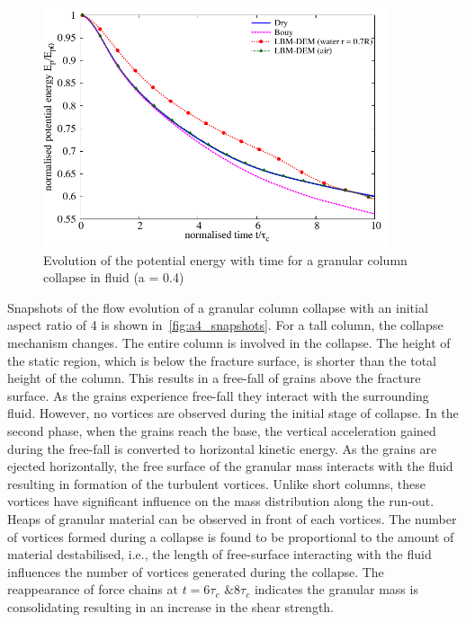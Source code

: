 \begin{figure}
	\centering
    \includegraphics[width=0.9\textwidth]{PE_a04f}
    \caption{Evolution of the potential energy with time for a granular column 
    collapse in fluid (a = 0.4)}
    \label{fig:PE_a04f}
\end{figure}


Snapshots of the flow evolution of a granular column collapse with an initial 
aspect ratio of 4 is shown in~\cref{fig:a4_snapshots}. For a tall column, the 
collapse mechanism changes. The entire column is involved in the collapse. The 
height of the static region, which is below the fracture surface, is shorter 
than the total height of the column. This results in a free-fall of grains 
above the fracture surface. As the grains experience free-fall they interact 
with the surrounding fluid. However, no vortices are observed during the 
initial stage of collapse. In the second phase, when the grains reach the base, 
the vertical acceleration gained during the free-fall is converted to 
horizontal kinetic energy. As the grains are ejected horizontally, the free 
surface of the granular mass interacts with the fluid resulting in formation of 
the turbulent vortices. Unlike short columns, these vortices have significant 
influence on the mass distribution along the run-out. Heaps of granular 
material can be observed in front of each vortices. The number of vortices 
formed during a collapse is found to be proportional to the amount of material 
destabilised, i.e., the length of free-surface interacting with the fluid 
influences the number of vortices generated during the collapse. The 
reappearance of force chains at $t = 6\tau_c$ $\& 8\tau_c$ indicates the 
granular mass is consolidating resulting in an increase in the shear strength. 

